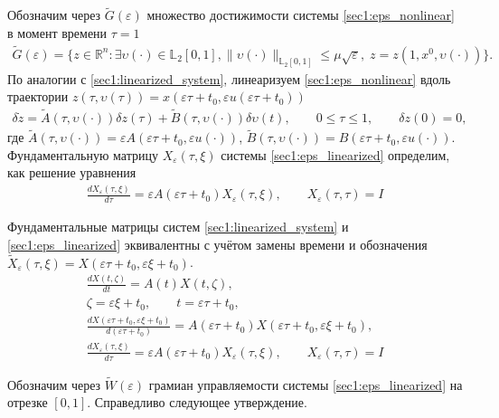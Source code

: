 \documentclass[../main.tex]{subfiles}
\begin{document}
Обозначим через $\widetilde{G}(\varepsilon)$ множество достижимости системы \eqref{sec1:eps_nonlinear} в момент времени $\tau=1$
\begin{gather*}
    \widetilde{G}(\varepsilon)=\{z\in \mathbb{R}^n:\exists \upsilon(\cdot)\in \mathbb{L}_2[0,1],  \lVert \upsilon(\cdot)\rVert_{\mathbb{L}_2[0,1]}
    \leqslant  \mu \sqrt{\varepsilon}, \; z=z(1,x^0,\upsilon(\cdot))\}.
\end{gather*}
По аналогии с \eqref{sec1:linearized_system}, линеаризуем \eqref{sec1:eps_nonlinear} вдоль траектории $ z(\tau,\upsilon(\tau)) = x(\varepsilon \tau + t_0,\varepsilon u(\varepsilon \tau + t_0)) $
\begin{gather}\label{sec1:eps_linearized}
    \delta\dot{z} = \widetilde{A}(\tau, \upsilon(\cdot)) \delta z(\tau) +\widetilde{B}(\tau, \upsilon(\cdot)) \delta \upsilon(t),\qquad 0 \leqslant \tau \leqslant 1,  \qquad \delta z(0) = 0,
\end{gather}
где $ \widetilde{A}(\tau, \upsilon(\cdot)) = \varepsilon A(\varepsilon \tau + t_0, \varepsilon u (\cdot)) $,  $\widetilde{B}(\tau, \upsilon(\cdot)) = B(\varepsilon \tau + t_0, \varepsilon u (\cdot)) $. 
Фундаментальную матрицу $ X_{\varepsilon}(\tau,\xi) $ системы \eqref{sec1:eps_linearized} определим, как решение уравнения
\begin{gather*}
    \frac{dX_{\varepsilon}(\tau,\xi)}{d\tau} = \varepsilon A(\varepsilon \tau + t_0) X_{\varepsilon}(\tau,\xi), \qquad X_{\varepsilon}(\tau,\tau) = I
\end{gather*}

Фундаментальные матрицы систем \eqref{sec1:linearized_system} и \eqref{sec1:eps_linearized} эквивалентны с учётом замены времени и обозначения $ \widetilde{X}_{\varepsilon}(\tau,\xi) = X(\varepsilon \tau + t_0,\varepsilon \xi + t_0) $.
\begin{gather*}
    \frac{dX(t,\zeta)}{dt} = A(t) X(t,\zeta), \\
    \zeta = \varepsilon \xi + t_0, \qquad t = \varepsilon \tau + t_0, \\
    \frac{dX(\varepsilon \tau + t_0,\varepsilon \xi + t_0)}{d(\varepsilon \tau + t_0)} = A(\varepsilon \tau + t_0) X(\varepsilon \tau + t_0,\varepsilon \xi + t_0), \\
    \frac{dX_{ \varepsilon}(\tau,\xi)}{d\tau} = \varepsilon A(\varepsilon \tau + t_0) X_{ \varepsilon}(\tau,\xi), \qquad X_{\varepsilon}(\tau,\tau) = I
\end{gather*}

Обозначим через $ \widetilde{W}(\varepsilon) $ грамиан управляемости системы \eqref{sec1:eps_linearized} на отрезке $ [0,1] $.
Справедливо следующее утверждение.
\end{document}
